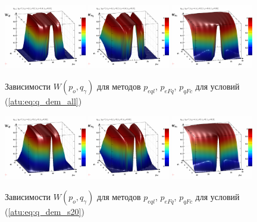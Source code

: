 \begin{figure}[htb!]
  \centerline{
    \includegraphics[width=0.32\textwidth]{p/qls_pe-p_po_qg_Wql_all.png}
    \hfill
    \includegraphics[width=0.32\textwidth]{p/qls_pe-p_po_qg_WFq_all.png}
    \hfill
    \includegraphics[width=0.32\textwidth]{p/qls_pe-p_po_qg_WFc_all.png}
  }
  \caption{Зависимости $W(p_o,q_\gamma)$ для методов $p_{eql}$, $p_{eFq}$, $p_{qFc}$ для условий (\ref{atu:eq:q_dem_all})}
  \label{atu:f:qsl_W_po_qg_all}
\end{figure}


\begin{figure}[htb!]
  \centerline{
    \includegraphics[width=0.32\textwidth]{p/qls_pe-p_po_qg_Wql_s20.png}
    \hfill
    \includegraphics[width=0.32\textwidth]{p/qls_pe-p_po_qg_WFq_s20.png}
    \hfill
    \includegraphics[width=0.32\textwidth]{p/qls_pe-p_po_qg_WFc_s20.png}
  }
  \caption{Зависимости $W(p_o,q_\gamma)$ для методов $p_{eql}$, $p_{eFq}$, $p_{qFc}$ для условий (\ref{atu:eq:q_dem_s20})}
  \label{atu:f:qsl_W_po_qg_s20}
\end{figure}

